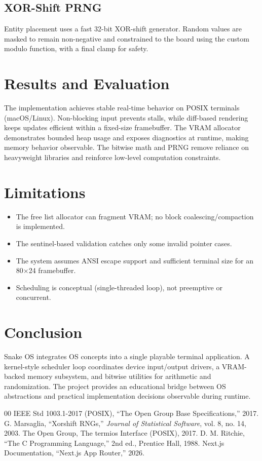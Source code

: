 \documentclass[conference]{IEEEtran}
\begin{document}
\subsection{XOR-Shift PRNG}
Entity placement uses a fast 32-bit XOR-shift generator. Random values are masked to remain non-negative and constrained to the board using the custom modulo function, with a final clamp for safety.

\section{Results and Evaluation}
The implementation achieves stable real-time behavior on POSIX terminals (macOS/Linux). Non-blocking input prevents stalls, while diff-based rendering keeps updates efficient within a fixed-size framebuffer. The VRAM allocator demonstrates bounded heap usage and exposes diagnostics at runtime, making memory behavior observable. The bitwise math and PRNG remove reliance on heavyweight libraries and reinforce low-level computation constraints.

\section{Limitations}
\begin{itemize}
    \item The free list allocator can fragment VRAM; no block coalescing/compaction is implemented.
    \item The sentinel-based validation catches only some invalid pointer cases.
    \item The system assumes ANSI escape support and sufficient terminal size for an 80$\times$24 framebuffer.
    \item Scheduling is conceptual (single-threaded loop), not preemptive or concurrent.
\end{itemize}

\section{Conclusion}
Snake OS integrates OS concepts into a single playable terminal application. A kernel-style scheduler loop coordinates device input/output drivers, a VRAM-backed memory subsystem, and bitwise utilities for arithmetic and randomization. The project provides an educational bridge between OS abstractions and practical implementation decisions observable during runtime.

\begin{thebibliography}{00}
 IEEE Std 1003.1-2017 (POSIX), ``The Open Group Base Specifications,'' 2017.
 G. Marsaglia, ``Xorshift RNGs,'' \textit{Journal of Statistical Software}, vol. 8, no. 14, 2003.
 The Open Group, The termios Interface (POSIX), 2017.
 D. M. Ritchie, ``The C Programming Language,'' 2nd ed., Prentice Hall, 1988.
 Next.js Documentation, ``Next.js App Router,'' 2026.
\end{thebibliography}
\end{document}
